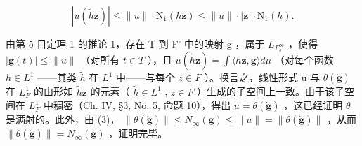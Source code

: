 \[
\left| u \left(\widetilde {h} \mathbf {z}\right) \right| \leqslant \| u \| \cdot \mathrm{N} _ {1} (h \mathbf {z}) \leqslant \| u \| \cdot | \mathbf {z} | \cdot \mathrm{N} _ {1} (h).
\]

由第 5 目定理 1 的推论 1，存在 T 到 F' 中的映射 g ，属于 \(L_{F_{s}^{\infty}}\) ，使得 \(|\mathbf{g}(t)| \leqslant \|u\|\) （对所有 \(t \in T\) ），且 \(u(\widetilde{h}\mathbf{z}) = \int \langle h\mathbf{z}, \mathbf{g} \rangle d\mu\) （对每个函数 \(h \in L^{1}\) ——其类 \(\widetilde{h}\) 在 \(L^{1}\) 中——与每个 \(z \in F\) ）。换言之，线性形式 u 与 \(\theta(\dot{\mathbf{g}})\) 在 \(L_{F}^{1}\) 的由形如 \(\widetilde{h}\mathbf{z}\) 的元素（ \(\widetilde{h} \in L^{1}\) , \(z \in F\) ）生成的子空间上一致。由于该子空间在 \(L_{F}^{1}\) 中稠密（Ch. IV, §3, No. 5, 命题 10），得出 \(u = \theta(\dot{\mathbf{g}})\) ，这已经证明 \(\theta\) 是满射的。此外，由 (3)， \(\|\theta(\dot{\mathbf{g}})\| \leqslant N_{\infty}(\mathbf{g}) \leqslant \|u\| = \|\theta(\dot{\mathbf{g}})\|\) ，从而 \(\|\theta(\dot{\mathbf{g}})\| = N_{\infty}(\mathbf{g})\) ，证明完毕。
\relax{}
